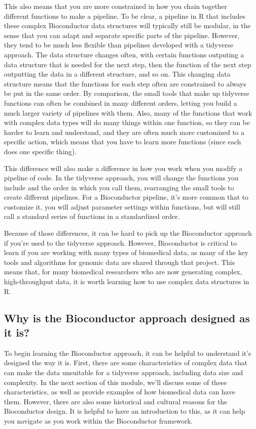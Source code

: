 \documentclass[]{tufte-book}
\begin{document}
This also means that you are more constrained in how you chain together
different functions to make a pipeline. To be clear, a pipeline in R that
includes these complex Bioconductor data structures will typically still be
modular, in the sense that you can adapt and separate specific parts of the
pipeline. However, they tend to be much less flexible than pipelines developed
with a tidyverse approach. The data structure changes often, with certain
functions outputing a data structure that is needed for the next step, then the
function of the next step outputting the data in a different structure, and so
on. This changing data structure means that the functions for each step often
are constrained to always be put in the same order. By comparison, the small
tools that make up tidyverse functions can often be combined in many different
orders, letting you build a much larger variety of pipelines with them. Also,
many of the functions that work with complex data types will do many things
within one function, so they can be harder to learn and understand, and they are
often much more customized to a specific action, which means that you have to
learn more functions (since each does one specific thing).

This difference will also make a difference in how you work when you modify a
pipeline of code. In the tidyverse approach, you will change the functions you
include and the order in which you call them, rearranging the small tools to
create different pipelines. For a Bioconductor pipeline, it's more common that
to customize it, you will adjust parameter settings within functions, but will
still call a standard series of functions in a standardized order.

Because of those differences, it can be hard to pick up the Bioconductor
approach if you're used to the tidyverse approach. However, Bioconductor is
critical to learn if you are working with many types of biomedical data, as many
of the key tools and algorithms for genomic data are shared through that
project. This means that, for many biomedical researchers who are now generating
complex, high-throughput data, it is worth learning how to use complex data
structures in R.

\subsection{Why is the Bioconductor approach designed as it is?}\label{why-is-the-bioconductor-approach-designed-as-it-is}

To begin learning the Bioconductor approach, it can be helpful to understand
it's designed the way it is. First, there are some characteristics of complex
data that can make the data unsuitable for a tidyverse approach, including data
size and complexity. In the next section of this module, we'll discuss some of
these characteristics, as well as provide examples of how biomedical data can
have them. However, there are also some historical and cultural reasons for the
Bioconductor design. It is helpful to have an introduction to this, as it can
help you navigate as you work within the Bioconductor framework.
\end{document}
